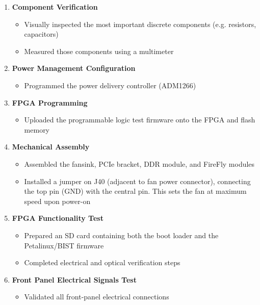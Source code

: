 \begin{enumerate}
    \item \textbf{Component Verification}
    \begin{itemize}
        \item Visually inspected the most important discrete components (e.g. resistors, capacitors)
        \item Measured those components using a multimeter
    \end{itemize}

    \item \textbf{Power Management Configuration}
    \begin{itemize}
        \item Programmed the power delivery controller (ADM1266)
    \end{itemize}

    \item \textbf{FPGA Programming}
    \begin{itemize}
        \item Uploaded the programmable logic test firmware onto the FPGA and flash memory
    \end{itemize}

    \item \textbf{Mechanical Assembly}
    \begin{itemize}
        \item Assembled the fansink, PCIe bracket, DDR module, and FireFly modules
        \item Installed a jumper on J40 (adjacent to fan power connector), connecting the top pin (GND) with the central pin. This sets the fan at maximum speed upon power-on
    \end{itemize}

    \item \textbf{FPGA Functionality Test}
    \begin{itemize}
        \item Prepared an SD card containing both the boot loader and the Petalinux/BIST firmware
        \item Completed electrical and optical verification steps
    \end{itemize}

    \item \textbf{Front Panel Electrical Signals Test}
    \begin{itemize}
        \item Validated all front-panel electrical connections
    \end{itemize}
\end{enumerate}


